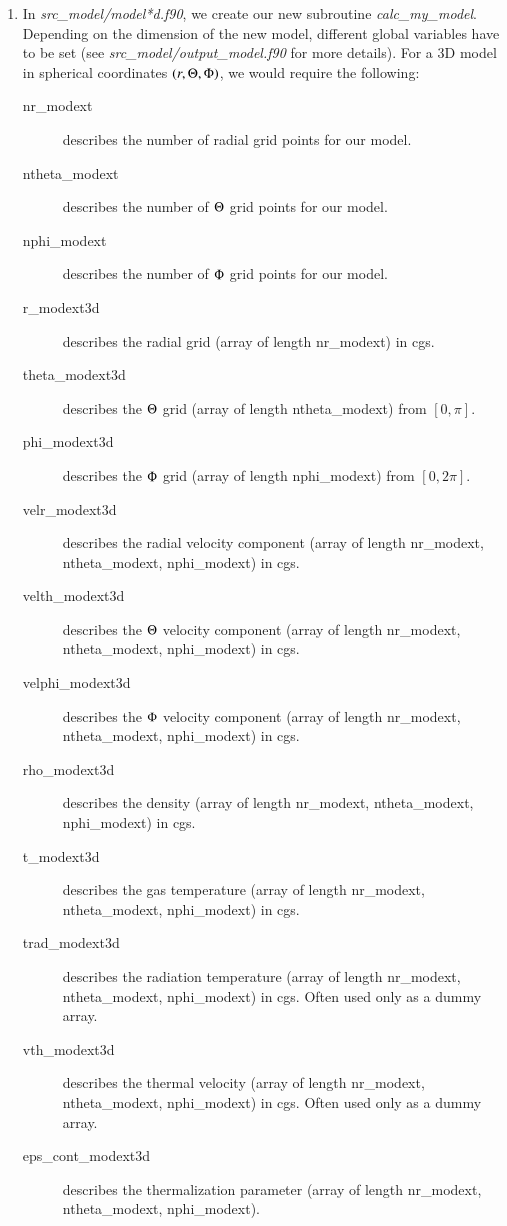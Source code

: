 \documentclass[10pt,a4paper]{article}
\begin{document}
\begin{enumerate}
\item In \textit{src\_model/model*d.f90}, we create our new subroutine
  \textit{calc\_my\_model}. Depending on the dimension of the new
  model, different global variables have to be set (see
  \textit{src\_model/output\_model.f90} for more details). For a 3D
  model in spherical coordinates $(r,\Theta,\Phi)$, we would require the following:
  \begin{description}
  \item[nr\_modext] describes the number of radial grid points for our model.
  \item[ntheta\_modext] describes the number of $\Theta$ grid points for our model.
  \item[nphi\_modext] describes the number of $\Phi$ grid points for our model.
  \item[r\_modext3d] describes the radial grid (array of length nr\_modext) in cgs.
  \item[theta\_modext3d] describes the $\Theta$ grid (array of length ntheta\_modext) from $[0,\pi]$.
  \item[phi\_modext3d] describes the $\Phi$ grid (array of length nphi\_modext) from $[0,2\pi]$.
  \item[velr\_modext3d] describes the radial velocity component (array of length nr\_modext, ntheta\_modext, nphi\_modext) in cgs.
  \item[velth\_modext3d] describes the $\Theta$ velocity component (array of length nr\_modext, ntheta\_modext, nphi\_modext) in cgs.
  \item[velphi\_modext3d] describes the $\Phi$ velocity component (array of length nr\_modext, ntheta\_modext, nphi\_modext) in cgs.
  \item[rho\_modext3d] describes the density (array of length nr\_modext, ntheta\_modext, nphi\_modext) in cgs.
  \item[t\_modext3d] describes the gas temperature (array of length nr\_modext, ntheta\_modext, nphi\_modext) in cgs.
  \item[trad\_modext3d] describes the radiation temperature (array of length nr\_modext, ntheta\_modext, nphi\_modext) in cgs. Often used only as a dummy array.
  \item[vth\_modext3d] describes the thermal velocity (array of length nr\_modext, ntheta\_modext, nphi\_modext) in cgs. Often used only as a dummy array.
  \item[eps\_cont\_modext3d] describes the thermalization parameter (array of length nr\_modext, ntheta\_modext, nphi\_modext).
    \end{description}
\end{enumerate}
\end{document}
